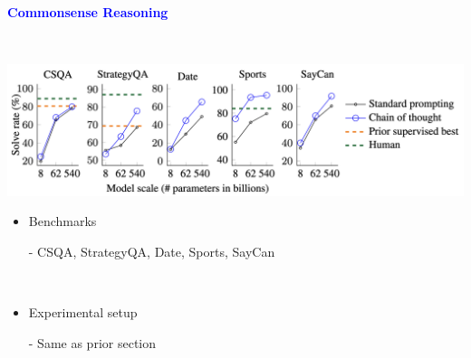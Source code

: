 \documentclass[professionalfont]{beamer}
\begin{document}
\begin{frame}
\begin{center}
    { \textbf{\textcolor{blue}{ {\fontsize{12}{14}\selectfont Commonsense Reasoning} }} }
\end{center}
\\[0.3cm]

\begin{center}
    \includegraphics[width=1.0\textwidth]{figure7.png}
\end{center}

{\fontsize{10}{14}\selectfont 
\begin{itemize}
    \item Benchmarks
    
    - CSQA, StrategyQA, Date, Sports, SayCan

    \\[0.2cm]

    \item Experimental setup

    - Same as prior section
\end{itemize}
}

\end{frame}
\end{document}
